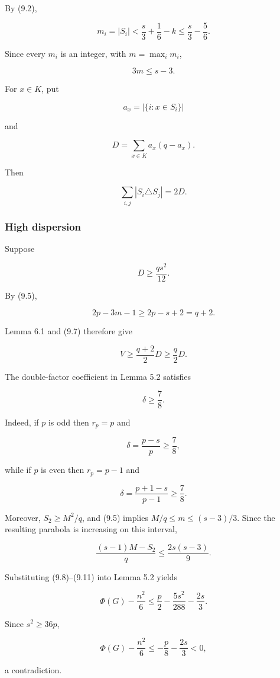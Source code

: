 \documentclass[english,11pt,a4paper]{article}
\begin{document}
By (9.2),

\[
m_i=|S_i|
<
\frac s3+\frac16-k
\le
\frac s3-\frac56.
\]

Since every \(m_i\) is an integer, with \(m=\max_i m_i\),

\[
\boxed{3m\le s-3}.
\tag{9.5}
\]

For \(x\in K\), put

\[
a_x=|\{i:x\in S_i\}|
\]

and

\[
D=\sum_{x\in K}a_x(q-a_x).
\tag{9.6}
\]

Then

\[
\sum_{i,j}|S_i\triangle S_j|=2D.
\tag{9.7}
\]

\subsubsection{High dispersion}\label{high-dispersion}

Suppose

\[
D\ge\frac{qs^2}{12}.
\tag{9.8}
\]

By (9.5),

\[
2p-3m-1\ge2p-s+2=q+2.
\]

Lemma 6.1 and (9.7) therefore give

\[
V
\ge
\frac{q+2}{2}D
\ge
\frac q2D.
\tag{9.9}
\]

The double-factor coefficient in Lemma 5.2 satisfies

\[
\boxed{\delta\ge\frac78}.
\tag{9.10}
\]

Indeed, if \(p\) is odd then \(r_p=p\) and

\[
\delta=\frac{p-s}{p}\ge\frac78,
\]

while if \(p\) is even then \(r_p=p-1\) and

\[
\delta=\frac{p+1-s}{p-1}\ge\frac78.
\]

Moreover, \(S_2\ge M^2/q\), and (9.5) implies \(M/q\le m\le(s-3)/3\).
Since the resulting parabola is increasing on this interval,

\[
\frac{(s-1)M-S_2}{q}
\le
\frac{2s(s-3)}9.
\tag{9.11}
\]

Substituting (9.8)--(9.11) into Lemma 5.2 yields

\[
\Phi(G)-\frac{n^2}{6}
\le
\frac p2-\frac{5s^2}{288}-\frac{2s}{3}.
\tag{9.12}
\]

Since \(s^2\ge36p\),

\[
\Phi(G)-\frac{n^2}{6}
\le
-\frac p8-\frac{2s}{3}<0,
\]

a contradiction.
\end{document}
